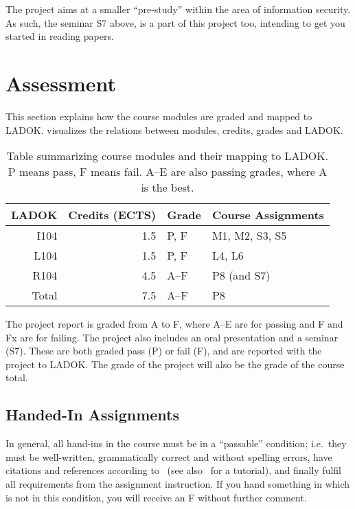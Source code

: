 The project aims at a smaller \enquote{pre-study} within the area of 
information security.
As such, the seminar S7 above, is a part of this project too, intending to get 
you started in reading papers.


\section{Assessment}
\label{Assessment}

This section explains how the course modules are graded and mapped to LADOK\@.
 visualizes the relations between modules, credits, grades and 
LADOK\@.

\begin{table}
  \centering
  \caption{%
    Table summarizing course modules and their mapping to LADOK\@.
    P means pass, F means fail.
    A--E are also passing grades, where A is the best.
  }\label{LADOKTable}
  \begin{tabular}{rrll}
    \toprule
    LADOK & Credits (ECTS)  & Grade       & Course Assignments\\
    \midrule
    I104  & 1.5             & P, F        & M1, M2, S3, S5\\
    L104  & 1.5             & P, F        & L4, L6\\
    R104  & 4.5             & A--F        & P8 (and S7)\\
    \midrule
    Total & 7.5             & A--F        & P8\\
    \bottomrule
  \end{tabular}
\end{table}

The project report is graded from A to F, where A--E are for passing and F and 
Fx are for failing.
The project also includes an oral presentation and a seminar (S7).
These are both graded pass (P) or fail (F), and are reported with the project 
to LADOK\@.
The grade of the project will also be the grade of the course total.

\subsection{Handed-In Assignments}

In general, all hand-ins in the course must be in a \enquote{passable} 
condition; i.e.~they must be well-written, grammatically correct and without 
spelling errors, have citations and references according to~\cite{IEEEcitation} 
(see also~\cite{PurdueCitation} for a tutorial), and finally fulfil all 
requirements from the assignment instruction.
If you hand something in which is not in this condition, you will receive an 
F without further comment.

